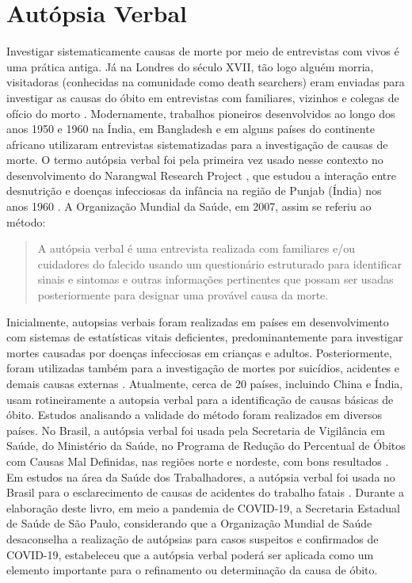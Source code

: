 \chapter{Autópsia Verbal}

Investigar sistematicamente causas de morte por meio de entrevistas com vivos é uma prática antiga. Já na Londres do século XVII, tão logo alguém morria, visitadoras (conhecidas na comunidade como death searchers) eram enviadas para investigar as causas do óbito em entrevistas com familiares, vizinhos e colegas de ofício do morto \citep{garenne2006potential, spence2016accidents}. Modernamente, trabalhos pioneiros desenvolvidos ao longo dos anos 1950 e 1960 na Índia, em Bangladesh e em alguns países do continente africano utilizaram entrevistas sistematizadas para a investigação de causas de morte. O termo autópsia verbal foi pela primeira vez usado nesse contexto no desenvolvimento do Narangwal Research Project \citep{bang1992diagnosis}, que estudou a interação entre desnutrição e doenças infecciosas da infância na região de Punjab (Índia) nos anos 1960 \citep{taylor1983child}. A Organização Mundial da Saúde, em 2007, assim se referiu ao método:

\begin{quote}
A autópsia verbal é uma entrevista realizada com familiares e/ou cuidadores do falecido usando um questionário estruturado para identificar sinais e sintomas e outras informações pertinentes que possam ser usadas posteriormente para designar uma provável causa da morte.\citep{abou2007verbal}    
\end{quote}


Inicialmente, autopsias verbais foram realizadas em países em desenvolvimento com sistemas de estatísticas vitais deficientes, predominantemente para investigar mortes causadas por doenças infecciosas em crianças e adultos. Posteriormente, foram utilizadas também para a investigação de mortes por suicídios, acidentes e demais causas externas \citep{gajalakshmi2007suicide}\citep{kahn2000validation}. Atualmente, cerca de 20 países, incluindo China e Índia, usam rotineiramente a autopsia verbal para a identificação de causas básicas de óbito\citep{baiden2007setting}. Estudos analisando a validade do método foram realizados em diversos países\citep{ronsmans1998comparison, world1999standard, chandramohan2001effect, setel2006core}. No Brasil, a autópsia verbal foi usada pela Secretaria de Vigilância em Saúde, do Ministério da Saúde, no Programa de Redução do Percentual de Óbitos com Causas Mal Definidas, nas regiões norte e nordeste, com bons resultados \citep{campos2010uso}. Em estudos na área da Saúde dos Trabalhadores, a autópsia verbal foi usada no Brasil para o esclarecimento de causas de acidentes do trabalho fatais \citep{oliveira1997acidentes, mendes2003verso, CordeiroTrab}. Durante a elaboração deste livro, em meio a pandemia de COVID-19, a Secretaria Estadual de Saúde de São Paulo, considerando que a Organização Mundial de Saúde desaconselha a realização de autópsias para casos suspeitos e confirmados de COVID-19, estabeleceu que a autópsia verbal poderá ser aplicada como um elemento importante para o refinamento ou determinação da causa de óbito\citep{SSESP2020}.

